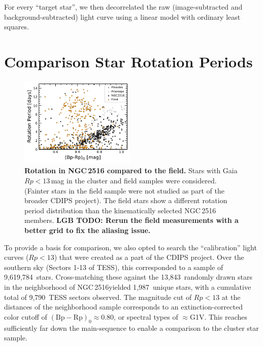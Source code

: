 \documentclass[12pt,twocolumn,tighten]{aastex63}
\newcommand{\cn}{NGC\,2516} %
\newcommand{\nnbhd}{13{,}843} %
\newcommand{\ncalibration}{9{,}619{,}784} %
\newcommand{\nnbhdcaliblc}{9{,}790} %
\newcommand{\nnbhdcalibstar}{1{,}987} %
\newcommand{\bpmrp}{(\mathrm{Bp}-\mathrm{Rp})_0}
\begin{document}
For every ``target star'', we then decorrelated the raw
(image-subtracted and background-subtracted) light curve
using a linear model with ordinary least squares.

\section{Comparison Star Rotation Periods}
\label{app:compstar}

\begin{figure}[t]
	\begin{center}
		\leavevmode
    \includegraphics[width=0.49\textwidth]{f9.pdf}
	\end{center}
	\vspace{-0.7cm}
	\caption{ {\bf Rotation in NGC\,2516 compared to the field.}
  Stars with Gaia $Rp<13$\,mag in the cluster and field samples were
  considered. (Fainter stars in the field sample were not studied as part
  of the broader CDIPS project).
  The field stars show a different rotation period distribution than
  the kinematically selected NGC\,2516 members.
  {\bf LGB TODO: Rerun the field measurements with a better grid to fix the aliasing issue.}
  \label{fig:compstar}
	}
\end{figure}

To provide a basis for comparison, we also opted to search the
``calibration'' light curves ($Rp<13$) that were created as a part of
the CDIPS project.  Over the southern sky (Sectors 1-13 of TESS), this
corresponded to a sample of \ncalibration\ stars.  Cross-matching these
against the \nnbhd\ randomly drawn stars in the neighborhood of \cn yielded
\nnbhdcalibstar\ unique stars, with a cumulative total of
\nnbhdcaliblc\ TESS
sectors observed.
The magnitude cut of $Rp<13$ at the distances of the neighborhood sample
corresponds to an extinction-corrected color cutoff of $\bpmrp
\approx 0.80$, or spectral types of $\approx$G1V.
This reaches sufficiently far down the main-sequence to enable a
comparison to the cluster star sample.
\end{document}
